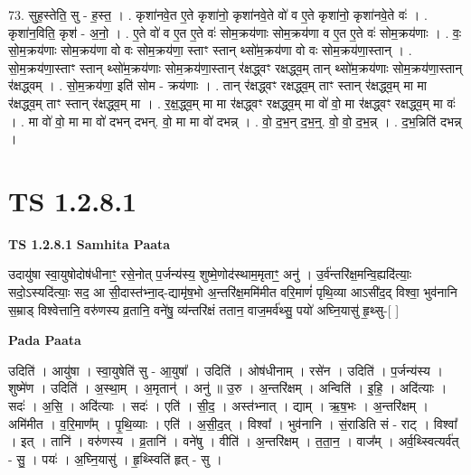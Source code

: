 \documentclass[17pt]{extarticle}
\begin{document}
73. सुह॒स्तेति॒ सु - ह॒स्त॒ । . कृशा॑नवे॒त ए॒ते कृशा॑नो॒ कृशा॑नवे॒ते वो॑ व ए॒ते कृशा॑नो॒ कृशा॑नवे॒ते वः॑ । . कृशा॑न॒विति॒ कृश॑ - अ॒नो॒ । . ए॒ते वो॑ व ए॒त ए॒ते वः॑ सोम॒क्रय॑णाः सोम॒क्रय॑णा व ए॒त ए॒ते वः॑ सोम॒क्रय॑णाः । . वः॒ सो॒म॒क्रय॑णाः सोम॒क्रय॑णा वो वः सोम॒क्रय॑णा॒ स्ताꣳ स्तान् थ्सो॑म॒क्रय॑णा वो वः सोम॒क्रय॑णा॒स्तान् । . सो॒म॒क्रय॑णा॒स्ताꣳ स्तान् थ्सो॑म॒क्रय॑णाः सोम॒क्रय॑णा॒स्तान् र॑क्षद्ध्वꣳ रक्षद्ध्व॒म् तान् थ्सो॑म॒क्रय॑णाः सोम॒क्रय॑णा॒स्तान् र॑क्षद्ध्वम् । . सो॒म॒क्रय॑णा॒ इति॑ सोम - क्रय॑णाः । . तान् र॑क्षद्ध्वꣳ रक्षद्ध्व॒म् ताꣳ स्तान् र॑क्षद्ध्व॒म् मा मा र॑क्षद्ध्व॒म् ताꣳ स्तान् र॑क्षद्ध्व॒म् मा । . र॒क्ष॒द्ध्व॒म् मा मा र॑क्षद्ध्वꣳ रक्षद्ध्व॒म् मा वो॑ वो॒ मा र॑क्षद्ध्वꣳ रक्षद्ध्व॒म् मा वः॑ । . मा वो॑ वो॒ मा मा वो॑ दभन् दभन्. वो॒ मा मा वो॑ दभन्न् । . वो॒ द॒भ॒न् द॒भ॒न्॒. वो॒ वो॒ द॒भ॒न्न् । . द॒भ॒न्निति॑ दभन्न् । \newline
\pagebreak
{}
\section*{ TS 1.2.8.1 }

\textbf{TS 1.2.8.1 } \newline
\textbf{Samhita Paata} \newline

उदायु॑षा स्वा॒युषोदोष॑धीनाꣳ॒॒ रसे॒नोत् प॒र्जन्य॑स्य॒ शुष्मे॒णोद॑स्थाम॒मृताꣳ॒॒ अनु॑ । उ॒र्व॑न्तरि॑क्ष॒मन्वि॒ह्यदि॑त्याः॒ सदो॒ऽस्यदि॑त्याः॒ सद॒ आ सी॒दास्त॑भ्ना॒द्-द्यामृ॑ष॒भो अ॒न्तरि॑क्ष॒ममि॑मीत वरि॒माणं॑ पृथि॒व्या आऽसी॑द॒द् विश्वा॒ भुव॑नानि स॒म्राड् विश्वेत्तानि॒ वरु॑णस्य व्र॒तानि॒ वने॑षु॒ व्य॑न्तरि॑क्षं ततान॒ वाज॒मर्व॑थ्सु॒ पयो॑ अघ्नि॒यासु॑ हृ॒थ्सु-[ ] \newline

\textbf{Pada Paata} \newline

उदिति॑ । आयु॑षा । स्वा॒युषेति॑ सु - आ॒युषा᳚ । उदिति॑ । ओष॑धीनाम् । रसे॑न । उदिति॑ । प॒र्जन्य॑स्य । शुष्मे॑ण । उदिति॑ । अ॒स्था॒म् । अ॒मृतान्॑ । अनु॑ ॥ उ॒रु । अ॒न्तरि॑क्षम् । अन्विति॑ । इ॒हि॒ । अदि॑त्याः । सदः॑ । अ॒सि॒ । अदि॑त्याः । सदः॑ । एति॑ । सी॒द॒ । अस्त॑भ्नात् । द्याम् । ऋ॒ष॒भः । अ॒न्तरि॑क्षम् । अमि॑मीत । व॒रि॒माण᳚म् । पृ॒थि॒व्याः । एति॑ । अ॒सी॒द॒त् । विश्वा᳚ । भुव॑नानि । सं॒राडिति सं - राट् । विश्वा᳚ । इत् । तानि॑ । वरु॑णस्य । व्र॒तानि॑ । वने॑षु । वीति॑ । अ॒न्तरि॑क्षम् । त॒ता॒न॒ । वाज᳚म् । अर्व॒थ्स्वित्यर्व॑त् - सु॒ । पयः॑ । अ॒घ्नि॒यासु॑ । हृ॒थ्स्विति॑ हृत् - सु ।  \newline
\end{document}
